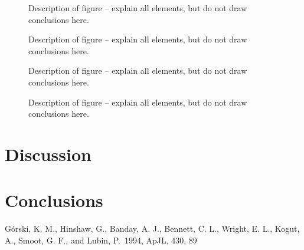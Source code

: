 \documentclass{emulateapj}
\begin{document}
\begin{figure}[t]
\mbox{}
\caption{Description of figure -- explain all elements, but do not
draw conclusions here.}
\label{fig:figure_label}
\end{figure}


\begin{figure}[t]
\mbox{}
\caption{Description of figure -- explain all elements, but do not
draw conclusions here.}
\label{fig:figure_label}
\end{figure}


\begin{figure}[t]
\mbox{}
\caption{Description of figure -- explain all elements, but do not
draw conclusions here.}
\label{fig:figure_label}
\end{figure}

\begin{figure}[t]
\mbox{}
\caption{Description of figure -- explain all elements, but do not
draw conclusions here.}
\label{fig:figure_label}
\end{figure}





\section{Discussion}
\label{sec:discussion}




\section{Conclusions}
\label{sec:conclusions}




%
%






\begin{acknowledgements}

\end{acknowledgements}

\begin{thebibliography}{}

 G{\'o}rski, K. M.,
  Hinshaw, G., Banday, A. J., Bennett, C. L., Wright, E. L., Kogut,
  A., Smoot, G. F., and Lubin, P.\ 1994, ApJL, 430, 89

\end{thebibliography}
\end{document}
